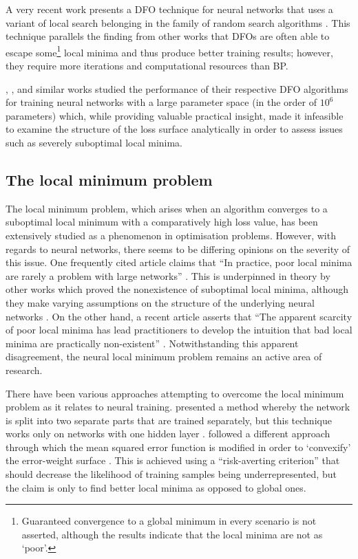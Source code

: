 A very recent work presents a DFO technique for neural networks that uses a variant of local search belonging in the family of random search algorithms \cite{aly2019}.
This technique parallels the finding from other works that DFOs are often able to escape some\footnote{Guaranteed convergence to a global minimum in every scenario is not asserted, although the results indicate that the local minima are not as `poor'.} local minima and thus produce better training results; however, they require more iterations and computational resources than BP. 

\citeauthor{aly2019}, \citeauthor{such2017}, and similar works studied the performance of their respective DFO algorithms for training neural networks with a large parameter space (in the order of $10^6$ parameters) which, while providing valuable practical insight, made it infeasible to examine the structure of the loss surface analytically in order to assess issues such as severely suboptimal local minima.

\subsection{The local minimum problem}
\label{sec:context_local_minimum_problem}
The local minimum problem, which arises when an algorithm converges to a suboptimal local minimum with a comparatively high loss value, has been extensively studied as a phenomenon in optimisation problems.
However, with regards to neural networks, there seems to be differing opinions on the severity of this issue. 
One frequently cited article claims that ``In practice, poor local minima are rarely a problem with large networks'' \cite{lecun2015}.
This is underpinned in theory by other works which proved the nonexistence of suboptimal local minima, although they make varying assumptions on the structure of the underlying neural networks \cite{kawaguchi2016,nguyen2018,laurent2018}.
On the other hand, a recent article asserts that ``The apparent scarcity of poor local minima has lead practitioners to develop the intuition that bad local minima \elide are practically non-existent'' \cite{goldblum2019}.
Notwithstanding this apparent disagreement, the neural local minimum problem remains an active area of research.

There have been various approaches attempting to overcome the local minimum problem as it relates to neural training.
\citeauthor{choi2008} presented a method whereby the network is split into two separate parts that are trained separately, but this technique works only on networks with one hidden layer \cite*{choi2008}.
\citeauthor{lo2012} followed a different approach through which the mean squared error function is modified in order to `convexify' the error-weight surface \cite*{lo2012,lo2017}.
This is achieved using a ``risk-averting criterion'' that should decrease the likelihood of training samples being underrepresented, but the claim is only to find better local minima as opposed to global ones.

